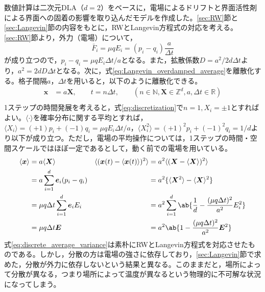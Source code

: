 \documentclass[autodetect-engine,dvi=dvipdfmx,a4paper,ja=standard,oneside,openany,11pt,draft]{bxjsbook}
\begin{document}
数値計算は二次元DLA（$d=2$）をベースに，電場によるドリフトと界面活性剤による界面への固着の影響を取り込んだモデルを作成した。\ref{sec:RW}節と\ref{sec:Langevin}節の内容をもとに，RWとLangevin方程式の対応を考える。\ref{sec:RW}節より，外力（電場）について，
\begin{equation}
  \bar{F}_i=\mu q E_i=(p_i-q_i)\frac{a}{\Delta t}
  \label{eq:force}
\end{equation}が成り立つので，$p_i-q_i=\mu q E_i\Delta t/a$となる。また，拡散係数$D=a^2/2d\Delta t$より，$a^2=2dD\Delta t$となる。次に，式\eqref{eq:Langevin_overdamped_average}を離散化する。格子間隔$a$，$\Delta t$を用いると，以下のように離散化できる。
\begin{equation}
  \begin{split}
    \bm{x} & =a\bm{X}, \qquad t=n\Delta t, \qquad (n\in\mathbb{N},\bm{X}\in\mathbb{Z}^d,a,\Delta t \in \mathbb{R}) \\
    \label{eq:discretization}
  \end{split}
\end{equation}
1ステップの時間発展を考えると，式\eqref{eq:discretization}で$n=1,X_i=\pm1$とすればよい。$\langle\cdot\rangle$を確率分布に関する平均とすれば，$\langle X_i\rangle=(+1)p_i+(-1)q_i=\mu q E_i\Delta t/a$，$\langle X_i^2\rangle=(+1)^2p_i+(-1)^2q_i=1/d$より以下が成り立つ。ただし，電場の平均操作については，1ステップの時間・空間スケールではほぼ一定であるとして，動く前での電場を用いている。
\begin{equation}
  \begin{aligned}
    \langle\bm{x}\rangle & =a\langle\bm{X}\rangle                     & \langle(\bm{x}(t)-\langle\bm{x}(t)\rangle)^2\rangle & =a^2\langle(\bm{X}-\langle\bm{X}\rangle)^2\rangle                        \\
                         & =a\sum_{i=1}^{d}\bm{e}_i(p_i-q_i)          &                                                     & =a^2\{\langle\bm{X}^2\rangle-\langle\bm{X}\rangle^2\}                    \\
                         & =\mu q \Delta t\sum_{i=1}^{d} \bm{e}_i E_i &                                                     & =a^2\sum_{i=1}^{d}\ab\{\frac{1}{d}-\frac{(\mu q \Delta t)^2}{a^2}E_i^2\} \\
                         & =\mu q \Delta t\bm{E}                      &                                                     & =a^2\ab\{1-\frac{(\mu q \Delta t)^2}{a^2}\bm{E}^2\}                      \\
  \end{aligned}
  \label{eq:discrete_average_variance}
\end{equation}
式\ref{eq:discrete_average_variance}は素朴にRWとLangevin方程式を対応させたものである。しかし，分散の方は電場の強さに依存しており，\ref{sec:Langevin}節で求めた，分散が外力に依存しないという結果と異なる。このままだと，場所によって分散が異なる，つまり場所によって温度が異なるという物理的に不可解な状況になってしまう。
\end{document}
